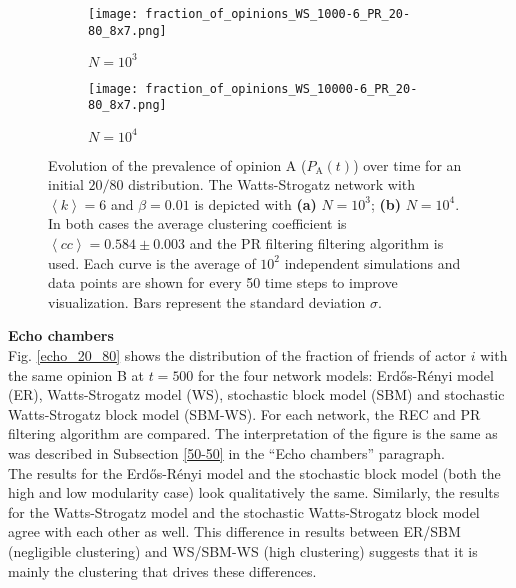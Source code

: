 \documentclass[11 pt , letterpaper , twoside , openright]{book}
\begin{document}
\begin{figure}[H]
  \begin{subfigure}[b]{0.49\textwidth}
    \caption{$N = 10^3$}
  	\texttt{[image: fraction\_of\_opinions\_WS\_1000-6\_PR\_20-80\_8x7.png]}
    \label{ws1000}
  \end{subfigure}
  \begin{subfigure}[b]{0.49\textwidth}
    \caption{$N = 10^4$}
  	\texttt{[image: fraction\_of\_opinions\_WS\_10000-6\_PR\_20-80\_8x7.png]}
    \label{ws10000}
  \end{subfigure}
  \captionsetup{format=plain}
  \caption[Evolution of the prevalence of opinion A ($P_\text{A}(t)$) over time for an initial $20/80$ opinion distribution for a WS model with $N=10^3$ or $N=10^4$, $\left<k\right>=6$ and $\beta = 0.01$. The PR filtering algorithm is used.]{Evolution of the prevalence of opinion A ($P_\text{A}(t)$) over time for an initial $20/80$ distribution. The Watts-Strogatz network with $\left<k\right> = 6$ and $\beta = 0.01$ is depicted with \textbf{(a)} $N=10^3$; \textbf{(b)} $N=10^4$. In both cases the average clustering coefficient is $\left<cc\right> = 0.584 \pm 0.003$ and the PR filtering filtering algorithm is used. Each curve is the average of $10^2$ independent simulations and data points are shown for every 50 time steps to improve visualization. Bars represent the standard deviation $\sigma$.}
\label{ev_op_WS_k=6}
\end{figure}
\noindent
\textbf{Echo chambers}\\
\newline
Fig. \ref{echo_20_80} shows the distribution of the fraction of friends of actor $i$ with the same opinion B at $t=500$ for the four network models: Erd\H{o}s-R\'{e}nyi model (ER), Watts-Strogatz model (WS), stochastic block model (SBM) and stochastic Watts-Strogatz block model (SBM-WS). For each network, the REC and PR filtering algorithm are compared. The interpretation of the figure is the same as was described in Subsection \ref{50-50} in the ``Echo chambers'' paragraph.\\
\newline
The results for the Erd\H{o}s-R\'{e}nyi model and the stochastic block model (both the high and low modularity case) look qualitatively the same. Similarly, the results for the Watts-Strogatz model and the stochastic Watts-Strogatz block model agree with each other as well. This difference in results between ER/SBM (negligible clustering) and WS/SBM-WS (high clustering) suggests that it is mainly the clustering that drives these differences.\\
\end{document}
